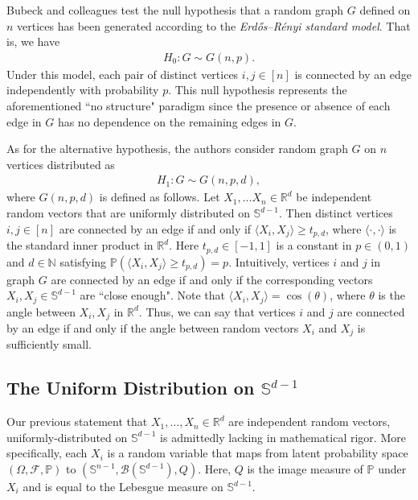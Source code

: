 \documentclass{article}
\begin{document}
Bubeck and colleagues test the null hypothesis that a random graph $G$ defined on $n$ vertices has been generated according to the \textit{Erdős–Rényi standard model}. That is, we have
\begin{align}
    H_0: G \sim G(n, p).
\end{align}
Under this model, each pair of distinct vertices $i, j \in [n]$ is connected by an edge independently with probability $p$. This null hypothesis represents the aforementioned ``no structure" paradigm since the presence or absence of each edge in $G$ has no dependence on the remaining edges in $G$.

As for the alternative hypothesis, the authors consider random graph $G$ on $n$ vertices distributed as 
\begin{align}
    H_1: G \sim G(n, p, d),
\end{align}
where $G(n, p, d)$ is defined as follows. Let $X_1, \ldots X_n \in \mathbb{R}^d$ be independent random vectors that are uniformly distributed on $\mathbb{S}^{d-1}$. Then distinct vertices $i, j \in [n]$ are connected by an edge if and only if $\langle X_i, X_j \rangle \geq t_{p, d}$, where $\langle \cdot, \cdot \rangle$ is the standard inner product in $\mathbb{R}^d$. Here $t_{p,d} \in [-1, 1]$ is a constant in $p \in (0,1)$ and $d \in \mathbb{N}$ satisfying $\mathbb{P}(\langle X_i, X_j \rangle \geq t_{p,d}) = p$. Intuitively, vertices $i$ and $j$ in graph $G$ are connected by an edge if and only if the corresponding vectors $X_i, X_j \in \mathbb{S}^{d-1}$ are ``close enough". Note that $\langle X_i, X_j \rangle = \cos(\theta)$, where $\theta$ is the angle between $X_i, X_j$ in $\mathbb{R}^d$. Thus, we can say that vertices $i$ and $j$ are connected by an edge if and only if the angle between random vectors $X_i$ and $X_j$ is sufficiently small.

\subsection{The Uniform Distribution on $\mathbb{S}^{d-1}$}

Our previous statement that $X_1, \ldots, X_n \in \mathbb{R}^{d}$ are independent random vectors, uniformly-distributed on $\mathbb{S}^{d-1}$ is admittedly lacking in mathematical rigor. More specifically, each $X_i$ is a random variable that maps from latent probability space $(\Omega, \mathcal{F}, \mathbb{P})$ to $(\mathbb{S}^{n-1}, \mathcal{B}(\mathbb{S}^{d-1}), Q)$. Here,  $Q$ is the image measure of $\mathbb{P}$ under $X_i$ and is equal to the Lebesgue measure on $\mathbb{S}^{d-1}$.
\end{document}
